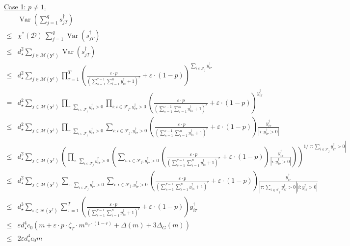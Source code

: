 \documentclass[nonblindrev]{informs3noheader}
\DeclareMathOperator{\Var}{Var}
\def\calD{\mathcal{D}}
\def\calF{\mathcal{F}}
\def\calM{\mathcal{M}}
\def\calN{\mathcal{N}}
\def\by{\boldsymbol{y}}
\begin{document}
\underline{Case 1: $p\neq 1$.}
\begin{align*}
	&\Var\left(\sum_{j=1}^q s^\dagger_{jT}\right)
	\\\leq & \chi^*(\calD)\ \sum_{j=1}^q \Var(s^\dagger_{jT})
	\\\leq & d_\star^2 \sum_{j \in \calM(\by^\dagger)} \Var(s^\dagger_{jT})
	\\\leq & d_\star^2\sum_{j \in \calM(\by^\dagger)}  \prod_{\tau=1}^T \left(\frac{\varepsilon\cdot p}{\left(\sum_{s=1}^{\tau-1} \sum_{i=1}^n y^\dagger_{is} + 1\right)^r}+\varepsilon\cdot(1-p)\right)^{\sum_{i \in \calF_j} y^\dagger_{i\tau}}
	\\= & d_\star^2\sum_{j \in \calM(\by^\dagger)}  \prod_{\tau:\sum_{i \in \calF_j} y^\dagger_{i\tau}>0 }  \prod_{i:i \in \calF_j, y^\dagger_{i\tau}>0 }  \left(\frac{\varepsilon\cdot p}{\left(\sum_{s=1}^{\tau-1} \sum_{i=1}^n y^\dagger_{is} + 1\right)^r}+\varepsilon\cdot(1-p)\right)^{ y^\dagger_{i\tau}}    
	\\\leq & d_\star^2\sum_{j \in \calM(\by^\dagger)}  \prod_{\tau:\sum_{i \in \calF_j} y^\dagger_{i\tau}>0 } \sum_{i: i \in \calF_j,  y^\dagger_{i\tau}>0} \left(\frac{\varepsilon\cdot p}{\left(\sum_{s=1}^{\tau-1} \sum_{i=1}^n y^\dagger_{is} + 1\right)^r}+\varepsilon\cdot(1-p)\right)\frac{y^\dagger_{i\tau}}{|i:  y^\dagger_{i\tau}>0|}
	\\\leq & d_\star^2\sum_{j \in \calM(\by^\dagger)}  \left(\prod_{\tau:\sum_{i \in \calF_j} y^\dagger_{i\tau}>0 } \left(\sum_{i: i \in \calF_j,  y^\dagger_{i\tau}>0} \left(\frac{\varepsilon\cdot p}{\left(\sum_{s=1}^{\tau-1} \sum_{i=1}^n y^\dagger_{is} + 1\right)^r}+\varepsilon\cdot(1-p)\right)\frac{y^\dagger_{i\tau}}{|i:  y^\dagger_{i\tau}>0|}\right)\right)^{1/|\tau:\sum_{i \in \calF_j} y^\dagger_{i\tau}>0 |}
	\\\leq & d_\star^2\sum_{j \in \calM(\by^\dagger)}  \sum_{\tau:\sum_{i \in \calF_j} y^\dagger_{i\tau}>0 }\sum_{i: i \in \calF_j,  y^\dagger_{i\tau}>0}\left(\frac{\varepsilon\cdot p}{\left(\sum_{s=1}^{\tau-1} \sum_{i=1}^n y^\dagger_{is} + 1\right)^r}+\varepsilon\cdot(1-p)\right)\frac{y^\dagger_{i\tau}}{|\tau:\sum_{i \in \calF_j} y^\dagger_{i\tau}>0 ||i:  y^\dagger_{i\tau}>0|}    
	\\\leq & d_\star^3\sum_{i \in \calN(\by^\dagger)} \sum_{\tau=1}^T \left(\frac{\varepsilon\cdot p}{\left(\sum_{s=1}^{\tau-1} \sum_{i=1}^n y^\dagger_{is} + 1\right)^r}+\varepsilon\cdot(1-p)\right)y^\dagger_{i\tau}
	\\\leq & \varepsilon d_\star^4 c_0 (m + \varepsilon \cdot p \cdot \zeta_T \cdot m^{\alpha_T \cdot(1-r)} + \Delta(m)+3\Delta_G(m))
	\\\leq& 2\varepsilon d_\star^4 c_0 m
\end{align*}
\end{document}
